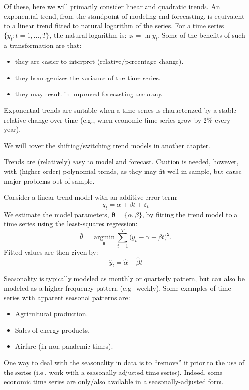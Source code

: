 \documentclass[
  12pt,
  oneside]{book}
\providecommand{\tightlist}{%
  \setlength{\itemsep}{0pt}\setlength{\parskip}{0pt}}
\begin{document}
Of these, here we will primarily consider linear and quadratic trends. An exponential trend, from the standpoint of modeling and forecasting, is equivalent to a linear trend fitted to natural logarithm of the series. For a time series \(\{y_t: t=1,\ldots,T\}\), the natural logarithm is: \(z_t = \ln{y_t}\). Some of the benefits of such a transformation are that:

\begin{itemize}
\tightlist
\item
  they are easier to interpret (relative/percentage change).
\item
  they homogenizes the variance of the time series.
\item
  they may result in improved forecasting accuracy.
\end{itemize}

Exponential trends are suitable when a time series is characterized by a stable relative change over time (e.g., when economic time series grow by 2\% every year).

We will cover the shifting/switching trend models in another chapter.

Trends are (relatively) easy to model and forecast. Caution is needed, however, with (higher order) polynomial trends, as they may fit well in-sample, but cause major problems out-of-sample.

Consider a linear trend model with an additive error term: \[y_t = \alpha + \beta t + \varepsilon_t\] We estimate the model parameters, \(\mathbf{\theta}=\{\alpha,\beta\}\), by fitting the trend model to a time series using the least-squares regression: \[\hat{\theta} = \operatorname*{argmin}_{\mathbf{\theta}} \sum_{t=1}^{T}\big(y_t - \alpha - \beta t\big)^2.\] Fitted values are then given by: \[\hat{y}_t = \hat{\alpha} + \hat{\beta} t\]

Seasonality is typically modeled as monthly or quarterly pattern, but can also be modeled as a higher frequency pattern (e.g.~weekly). Some examples of time series with apparent seasonal patterns are:

\begin{itemize}
\tightlist
\item
  Agricultural production.
\item
  Sales of energy products.
\item
  Airfare (in non-pandemic times).
\end{itemize}

One way to deal with the seasonality in data is to ``remove'' it prior to the use of the series (i.e., work with a seasonally adjusted time series). Indeed, some economic time series are only/also available in a seasonally-adjusted form.
\end{document}
